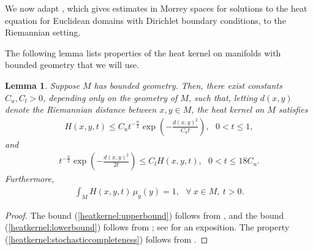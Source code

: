 \documentclass[12pt]{amsart}
\renewcommand{\1}{{\mathbf 1}}
\newtheorem{lemma}[thm]{Lemma}
\theoremstyle{others}
\numberwithin{equation}{section}
\begin{document}
        We now adapt \cite[Prop. 49.17]{superlinearbook}, which gives estimates in Morrey spaces for solutions to the heat equation for Euclidean domains with Dirichlet boundary conditions, to the Riemannian setting.

        The following lemma lists properties of the heat kernel on %
        manifolds with bounded geometry that we will use.
        \begin{lemma}\label{lemma:heatkernel}
        Suppose \(M\) has bounded geometry. Then, there exist constants \(C_u, C_l > 0\), depending only on the geometry of \(M\), such that, letting  \(d(x, y)\) denote the Riemannian distance between \(x, y \in M\), the heat kernel on \(M\) satisfies
		\begin{align}\label{heatkernel:upperbound}
		  H(x, y, t) \leq C_ut^{-\frac{n}{2}}\exp\left(-\frac{d(x, y)^2}{C_ut}\right), \ \ \ 0 < t \leq 1,
		\end{align} and        \begin{align}\label{heatkernel:lowerbound}
            t^{-\frac{n}{2}}\exp\left(-\frac{d(x, y)^2}{2t}\right) \leq C_lH(x, y, t), \ \ \ 0 < t \leq 18C_u.
        \end{align} Furthermore,	\begin{align}\label{heatkernel:stochasticcompleteness}
		\int_M H(x, y, t) \, \mu_g(y) = 1, \ \ \ \forall \ x \in M, \  t > 0. 
		\end{align} 
    \end{lemma}
\begin{proof}
    The bound (\ref{heatkernel:upperbound}) follows from \cite{chengliyauheatkernel}, and the bound (\ref{heatkernel:lowerbound})  follows from \cite{cheegeryau}; see \cite[\textsection A.4]{semilinearivpriem} for an exposition. The property (\ref{heatkernel:stochasticcompleteness}) follows from \cite{yauheatkernel}.
\end{proof}
\end{document}
